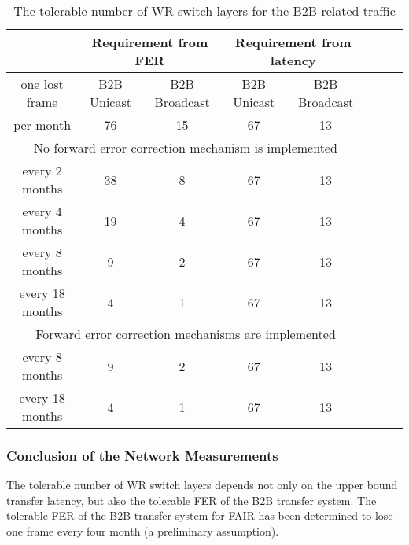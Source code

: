 \begin{table}[!htb]
\newcommand{\tabincell}[2]{\begin{tabular}{@{}#1@{}}#2\end{tabular}}
\caption{The tolerable number of WR switch layers for the B2B related traffic}
\label{tolerable_num}
\begin{center}
    \begin{tabular}{ | c |c | c | c | c | c | c | c |}
    \hline
                   & \multicolumn{2}{|c|}{Requirement from FER} & \multicolumn{2}{|c|}{Requirement from latency} \\ \hline
    one lost frame	& B2B Unicast & B2B Broadcast & B2B Unicast & B2B Broadcast \\ \hline
	 per month		&  \cellcolor{gray}76		&  \cellcolor{gray}15            & 67          & 13            \\ \hline 
	  \multicolumn{5}{|c|}{No forward error correction mechanism is implemented}  \\ \hline 
	 every 2 months	& 38	 & 8   & \cellcolor{gray}67 & \cellcolor{gray}13            \\ \hline 
	 every 4 months	& 19 	 & 4   & \cellcolor{gray}67 & \cellcolor{gray}13            \\ \hline 
	 every 8 months	& 9 	 & 2   & \cellcolor{gray}67 & \cellcolor{gray}13            \\ \hline 
	 every 18 months& 4 	 & 1   & \cellcolor{gray}67 & \cellcolor{gray}13            \\ \hline 
	  \multicolumn{5}{|c|}{Forward error correction mechanisms are implemented}  \\ \hline 
	 every 8 months	& \cellcolor{gray}9 	 & \cellcolor{gray}2   & 67 & 13            \\ \hline 
	 every 18 months& \cellcolor{gray}4 	 & \cellcolor{gray}1   & 67 & 13            \\ \hline 
    \end{tabular}
\end{center}
\end{table}

% 


\subsubsection{Conclusion of the Network Measurements}
The tolerable number of WR switch layers depends not only on the upper bound transfer latency, but also the tolerable FER of the B2B transfer system. The tolerable FER of the B2B transfer system for FAIR has been determined to lose one frame every four month (a preliminary assumption). 

